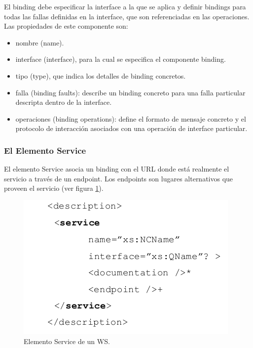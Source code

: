 El binding debe especificar la interface a la que se aplica y definir bindings para todas las fallas definidas en la interface, que son referenciadas en las operaciones.
Las propiedades de este componente son:

\begin{itemize}
	\item nombre (name).
	\item interface (interface), para la cual se especifica el componente binding.
	\item tipo (type), que indica los detalles de binding concretos.
	\item falla (binding faults): describe un binding concreto para una falla particular descripta dentro de la interface.
	\item operaciones (binding operations): define el formato de mensaje concreto y el protocolo de interacción asociados con una operación de interface particular.
\end{itemize}

\subsubsection*{El Elemento Service}

El elemento Service asocia un binding con el URL donde está realmente el servicio a través de un endpoint. Los endpoints son lugares alternativos que proveen el servicio (ver figura \ref{fig:Elemento Service de un WS}).

\begin{figure}[!h] 
	\begin{center}
		\includegraphics [scale=0.70]{imagenes/elemento_service.png}
	\end{center}
	\caption{Elemento Service de un WS.}
	\label{fig:Elemento Service de un WS}
\end{figure} 

